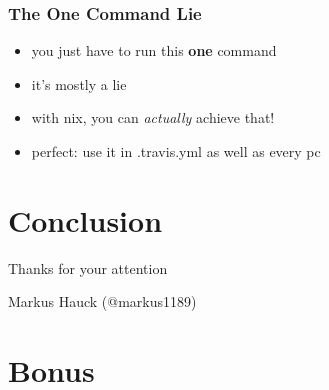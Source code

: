 \documentclass{beamer}
\begin{document}
\begin{frame}
  \frametitle{The One Command Lie}
  \begin{itemize}
  \item you just have to run this \textbf{one} command
  \item it's mostly a lie
  \item with nix, you can \textit{actually} achieve that!
  \item perfect: use it in .travis.yml as well as every pc
  \end{itemize}
\end{frame}

\section{Conclusion}\label{sec:conclusion}

\begin{frame}
  \begin{center}
    \Huge
    Thanks for your attention
  \end{center}
  \begin{center}
    \Huge
    Markus Hauck (@markus1189)
  \end{center}
\end{frame}

\begin{frame}
  \tableofcontents{}
\end{frame}

\appendix{}

\section*{Bonus}\label{sec:bonus}
\end{document}
